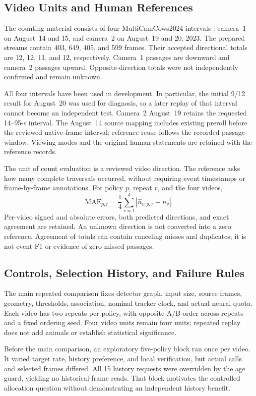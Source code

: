 \documentclass[journal]{IEEEtran}
\begin{document}
\subsection{Video Units and Human References}
The counting material consists of four MultiCamCows2024 intervals \cite{multicamcows2024}: camera~1 on August~14 and 15, and camera~2 on August~19 and 20, 2023. The prepared streams contain 403, 649, 405, and 599 frames. Their accepted directional totals are 12, 12, 11, and 12, respectively. Camera~1 passages are downward and camera~2 passages upward. Opposite-direction totals were not independently confirmed and remain unknown.

All four intervals have been used in development. In particular, the initial 9/12 result for August~20 was used for diagnosis, so a later replay of that interval cannot become an independent test. Camera~2 August~19 retains the requested 14--95-s interval. The August~14 source mapping includes existing preroll before the reviewed native-frame interval; reference reuse follows the recorded passage window. Viewing modes and the original human statements are retained with the reference records.

The unit of count evaluation is a reviewed video direction. The reference asks how many complete traversals occurred, without requiring event timestamps or frame-by-frame annotations. For policy $p$, repeat $r$, and the four videos,
\begin{equation}
 \mathrm{MAE}_{p,r}=\frac{1}{4}\sum_{v=1}^{4}|\hat n_{v,p,r}-n_v|.
\end{equation}
Per-video signed and absolute errors, both predicted directions, and exact agreement are retained. An unknown direction is not converted into a zero reference. Agreement of totals can contain canceling misses and duplicates; it is not event F1 or evidence of zero missed passages.

\subsection{Controls, Selection History, and Failure Rules}
The main repeated comparison fixes detector graph, input size, source frames, geometry, thresholds, association, nominal tracker clock, and actual neural quota. Each video has two repeats per policy, with opposite A/B order across repeats and a fixed ordering seed. Four video units remain four units; repeated replay does not add animals or establish statistical significance.

Before the main comparison, an exploratory five-policy block ran once per video. It varied target rate, history preference, and local verification, but actual calls and selected frames differed. All 15 history requests were overridden by the age guard, yielding no historical-frame reads. That block motivates the controlled allocation question without demonstrating an independent history benefit.
\end{document}
